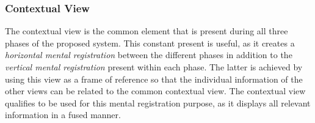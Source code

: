 \documentclass{vgtc}                          %
\begin{document}
\subsubsection{Contextual View}\label{sec:overview:planning:3d}
The contextual view is the common element that is present during all three phases of the proposed system. This constant present is useful, as it creates a \emph{horizontal mental registration} between the different phases in addition to the \emph{vertical mental registration} present within each phase. The latter is achieved by using this view as a frame of reference so that the individual information of the other views can be related to the common contextual view. The contextual view qualifies to be used for this mental registration purpose, as it displays all relevant information in a fused manner.
\end{document}
